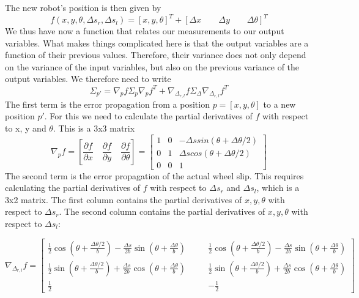 The new robot's position is then given by
\begin{equation}
f(x,y,\theta,\Delta s_r, \Delta s_l)=[x,y,\theta]^T + [\Delta x \qquad \Delta y \qquad \Delta \theta]^T
\end{equation}
We thus have now a function that relates our measurements to our output variables. What makes things complicated here is that the output variables are a function of their previous values. Therefore, their variance does not only depend on the variance of the input variables, but also on the previous variance of the output variables. We therefore need to write
\begin{equation}\label{eq:errorpropodom}
\Sigma_{p'}=\nabla_p f \Sigma_p \nabla_p f^T + \nabla_{\Delta_{r,l}}f \Sigma_{\Delta}\nabla_{\Delta_{r,l}}f^T
\end{equation}
The first term is the error propagation from a position $ p=[x,y,\theta]$ to a new position $ p'$. For this we need to calculate the partial derivatives of $ f$ with respect to x, y and $ \theta$. This is a 3x3 matrix
\begin{equation}
\nabla_p f=\left[\frac{\partial f}{\partial x} \quad \frac{\partial f}{\partial y} \quad \frac{\partial f}{\partial \theta}\right]=\left[\begin{array}{ccc}1 & 0 & -\Delta s sin(\theta +\Delta \theta /2)\\0 & 1 & \Delta s cos(\theta + \Delta \theta/2)\\0 & 0 &1\end{array}\right]
\end{equation}
The second term is the error propagation of the actual wheel slip. This requires calculating the partial derivatives of $ f$ with respect to $ \Delta s_r$ and $ \Delta s_l$, which is a 3x2 matrix. The first column contains the partial derivatives of $ x,y,\theta$ with respect to $ \Delta s_r$. The second column contains the partial derivatives of $ x,y,\theta$ with respect to $ \Delta s_l$:
\begin{scriptsize}
\begin{equation}
\nabla_{\Delta_{r,l}} f=\left[
\begin{array}{ccc}
\frac{1}{2}\cos(\theta+\frac{\Delta \theta/2}{b})
-\frac{\Delta s}{2b}\sin(\theta+\frac{\Delta \theta}{b})
& \quad & \frac{1}{2}\cos(\theta+\frac{\Delta \theta/2}{b})
-\frac{\Delta s}{2b}\sin(\theta+\frac{\Delta \theta}{b})
\\
\frac{1}{2}\sin(\theta+\frac{\Delta \theta/2}{b})
+\frac{\Delta s}{2b}\cos(\theta+\frac{\Delta \theta}{b})
& \quad & \frac{1}{2}\sin(\theta+\frac{\Delta \theta/2}{b})
+\frac{\Delta s}{2b}\cos(\theta+\frac{\Delta \theta}{b})
\\
\frac{1}{2} & \quad & -\frac{1}{2}
\end{array}
\right]
\end{equation}
\end{scriptsize}

